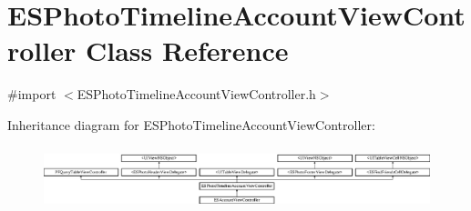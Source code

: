 \hypertarget{interface_e_s_photo_timeline_account_view_controller}{}\section{E\+S\+Photo\+Timeline\+Account\+View\+Controller Class Reference}
\label{interface_e_s_photo_timeline_account_view_controller}


{\ttfamily \#import $<$E\+S\+Photo\+Timeline\+Account\+View\+Controller.\+h$>$}

Inheritance diagram for E\+S\+Photo\+Timeline\+Account\+View\+Controller\+:\begin{figure}[H]
\begin{center}
\leavevmode
\includegraphics[height=1.828571cm]{interface_e_s_photo_timeline_account_view_controller}
\end{center}
\end{figure}
